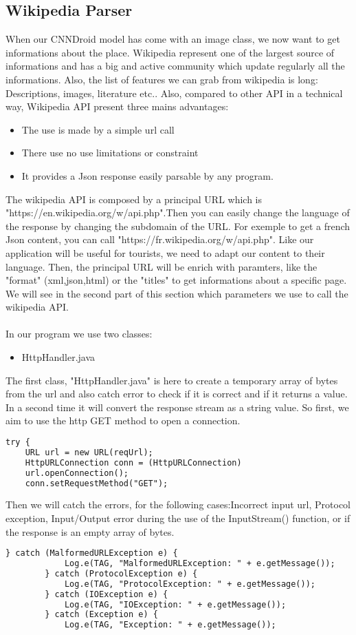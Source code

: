 \subsection {Wikipedia Parser}
When our CNNDroid model has come with an image class, we now want to get informations about the place. Wikipedia represent one of the largest source of informations and has a big and active community which update regularly all the informations. Also, the list of features we can grab from wikipedia is long: Descriptions, images, literature etc..
Also, compared to other API in a technical way, Wikipedia API present three mains advantages:
\begin{itemize}
    \item{The use is made by a simple url call}
    \item{There use no use limitations or constraint}
    \item{It provides a Json response easily parsable by any program. }
\end{itemize}
The wikipedia API is composed by a principal URL which is "https://en.wikipedia.org/w/api.php".Then you can easily change the language of the response by changing the subdomain of the URL. For exemple to get a french Json content, you can call "https://fr.wikipedia.org/w/api.php". Like our application will be useful for tourists, we need to adapt our content to their language.
Then, the principal URL will be enrich with paramters, like the "format" (xml,json,html) or the "titles" to get informations about a specific page. We will see in the second part of this section which parameters we use to call the wikipedia API.\\\\
In our program we use two classes:
\begin{itemize}
    \item{HttpHandler.java}
\end{itemize}
The first class, "HttpHandler.java" is here to create a temporary array of bytes from the url and also catch error to check if it is correct and if it returns a value. In a second time it will convert the response stream as a string value.
So first, we aim to use the http GET method to open a connection.
\begin{lstlisting}[language=XML, basicstyle=\scriptsize]
try {
    URL url = new URL(reqUrl);
    HttpURLConnection conn = (HttpURLConnection)
    url.openConnection();
    conn.setRequestMethod("GET");
\end{lstlisting}
Then we will catch the errors, for the following cases:Incorrect input url, Protocol exception, Input/Output error during the use of the InputStream() function, or if the response is an empty array of bytes.
\begin{lstlisting}[language=XML, basicstyle=\scriptsize]
    } catch (MalformedURLException e) {
            Log.e(TAG, "MalformedURLException: " + e.getMessage());
        } catch (ProtocolException e) {
            Log.e(TAG, "ProtocolException: " + e.getMessage());
        } catch (IOException e) {
            Log.e(TAG, "IOException: " + e.getMessage());
        } catch (Exception e) {
            Log.e(TAG, "Exception: " + e.getMessage());
\end{lstlisting}

